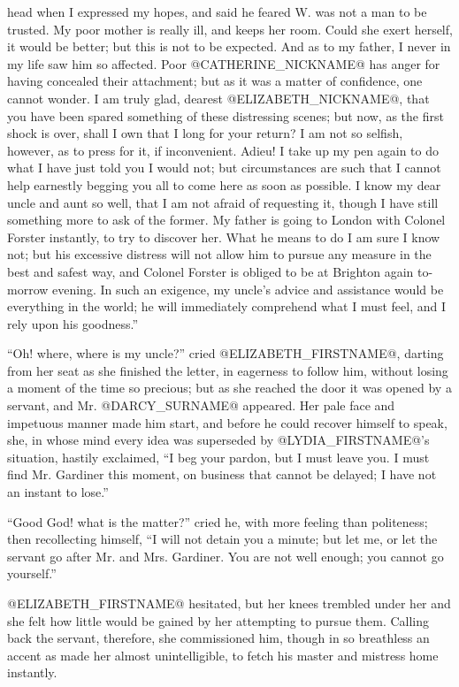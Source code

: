 head when I expressed my hopes, and said he feared W. was not a man to
be trusted. My poor mother is really ill, and keeps her room. Could she
exert herself, it would be better; but this is not to be expected. And
as to my father, I never in my life saw him so affected. Poor @CATHERINE_NICKNAME@ has
anger for having concealed their attachment; but as it was a matter of
confidence, one cannot wonder. I am truly glad, dearest @ELIZABETH_NICKNAME@, that you
have been spared something of these distressing scenes; but now, as the
first shock is over, shall I own that I long for your return? I am not
so selfish, however, as to press for it, if inconvenient. Adieu! I
take up my pen again to do what I have just told you I would not; but
circumstances are such that I cannot help earnestly begging you all to
come here as soon as possible. I know my dear uncle and aunt so well,
that I am not afraid of requesting it, though I have still something
more to ask of the former. My father is going to London with Colonel
Forster instantly, to try to discover her. What he means to do I am sure
I know not; but his excessive distress will not allow him to pursue any
measure in the best and safest way, and Colonel Forster is obliged to
be at Brighton again to-morrow evening. In such an exigence, my
uncle's advice and assistance would be everything in the world; he will
immediately comprehend what I must feel, and I rely upon his goodness.''

``Oh! where, where is my uncle?'' cried @ELIZABETH_FIRSTNAME@, darting from her seat
as she finished the letter, in eagerness to follow him, without losing
a moment of the time so precious; but as she reached the door it was
opened by a servant, and Mr. @DARCY_SURNAME@ appeared. Her pale face and impetuous
manner made him start, and before he could recover himself to speak,
she, in whose mind every idea was superseded by @LYDIA_FIRSTNAME@'s situation,
hastily exclaimed, ``I beg your pardon, but I must leave you. I must find
Mr. Gardiner this moment, on business that cannot be delayed; I have not
an instant to lose.''

``Good God! what is the matter?'' cried he, with more feeling than
politeness; then recollecting himself, ``I will not detain you a minute;
but let me, or let the servant go after Mr. and Mrs. Gardiner. You are
not well enough; you cannot go yourself.''

@ELIZABETH_FIRSTNAME@ hesitated, but her knees trembled under her and she felt how
little would be gained by her attempting to pursue them. Calling back
the servant, therefore, she commissioned him, though in so breathless
an accent as made her almost unintelligible, to fetch his master and
mistress home instantly.

